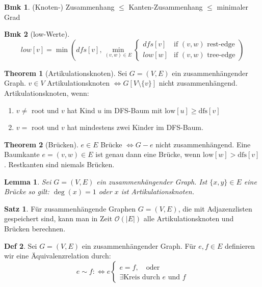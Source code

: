 \documentclass[a4paper, 10pt]{article}
\newtheorem*{lemma}{Lemma}
\theoremstyle{definition}
\newtheorem{definition}{Def}[section]
\newtheorem{theorem}[definition]{Satz}
\newtheorem*{note}{Bmk}
\theoremstyle{named}
\newtheorem*{ntheorem}{Theorem}
\newcommand{\BO}{\mathcal{O}}
\begin{document}
\begin{note}
    (Knoten-) Zusammenhang $\leq$ Kanten-Zusammenhang $\leq$ minimaler Grad
\end{note}

\begin{note}[low-Werte]
    $$low[v] = \min\left(dfs[v], \min_{(v, w) \in E} \begin{cases} dfs[v] & \text{if $(v, w)$ rest-edge} \\ low[w] & \text{if $(v, w)$ tree-edge}\end{cases} \right)$$
\end{note}

\begin{ntheorem}[Artikulationsknoten]
    Sei $G = (V, E)$ ein zusammenhängender Graph. $v \in V$ Artikulationsknoten $\iff G[V\setminus \{v\}]$ nicht zusammenhängend. Artikulationsknoten, wenn:
    \begin{enumerate}
        \item $v \neq$ root und $v$ hat Kind $u$ im DFS-Baum mit $\text{low}[u] \geq \text{dfs}[v]$
        \item $v = $ root und $v$ hat mindestens zwei Kinder im DFS-Baum.
    \end{enumerate}
\end{ntheorem}

\begin{ntheorem}[Brücken]
    $e \in E$ Brücke $\iff G-e$ nicht zusammenhängend.
    Eine Baumkante $e = (v, w) \in E$ ist genau dann eine Brücke, wenn $\text{low}[w] > \text{dfs}[v]$. Restkanten sind niemals Brücken. 
\end{ntheorem}

\begin{lemma}
    Sei $G = (V, E)$ ein zusammenhängender Graph. Ist $\{x, y\} \in E$ eine Brücke so gilt: $\deg(x) = 1$ oder $x$ ist Artikulationsknoten.
\end{lemma}

\setcounter{definition}{27}
\begin{theorem}
    Für zusammenhängende Graphen $G = (V, E)$, die mit Adjazenzlisten gespeichert sind, kann man in Zeit $\BO(|E|)$ alle Artikulationsknoten und Brücken berechnen.
\end{theorem}

\begin{definition}
    Sei $G = (V, E)$ ein zusammenhängender Graph. Für $e, f \in E$ definieren wir eine Äquivalenzrelation durch:
    $$e \sim f :\iff e \begin{cases}
        e = f, \quad \text{oder} \\
        \exists \text{Kreis durch $e$ und $f$}
    \end{cases}$$
\end{definition}
\end{document}
